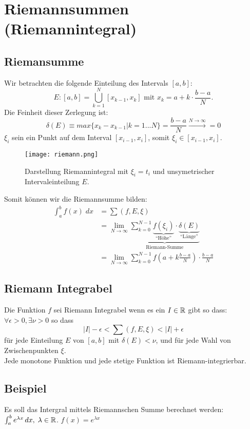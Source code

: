\section{Riemannsummen (Riemannintegral)}
\subsection{Riemansumme}
Wir betrachten die folgende Einteilung des Intervals $[a,b]$:\[
E: [a,b] = \bigcup_{k=1}^{N}[x_{k-1}, x_k] \text{ mit } x_k = a + k \cdot \frac{b-a}{N}.
\]
Die Feinheit dieser Zerlegung ist:\[
\delta(E) \equiv max\{x_k - x_{k-1}|k = 1...N\} = \frac{b-a}{N} \xrightarrow{N \to \infty} = 0
\]
$\xi_i$ sein ein Punkt auf dem Interval $[x_{i-1}, x_i]$, somit $\xi_i \in[x_{i-1}, x_i]$.\\

\begin{figure}
	\texttt{[image: riemann.png]}
	\caption[Bildunterschrift]{Darstellung Riemannintegral mit $\xi_i = t_i$ und unsymetrischer Intervaleinteilung $E$.}
\end{figure}

Somit können wir die Riemannsumme bilden:
\begin{align*}
\int_a^b f(x)\;dx &=\sum (f,E,\xi)\\
&= \lim_{N \to \infty} \underbrace{\sum_{k=0}^{N-1}
\underbrace{f(\xi_i)}_{\text{``Höhe''}} \cdot
\underbrace{\delta(E)}_{\text{``Länge''}}}_{\text{Riemann-Summe}}\\
&= \lim_{N \to \infty} \sum_{k=0}^{N-1} {f(a +
k\frac{b-a}{N})} \cdot \frac{b-a}{N}
\end{align*}


\subsection{Riemann Integrabel}
Die Funktion $f$ sei Riemann Integrabel wenn es ein $I \in \mathbb{R}$ gibt so dass: $\forall \epsilon > 0, \exists \nu > 0$ so dass \[
|I| - \epsilon < \sum (f,E,\xi) < |I| + \epsilon
\]
für jede Einteilung $E$ von $[a,b]$ mit $\delta(E) < \nu$, und für jede Wahl von Zwischenpunkten $\xi$.\\
Jede monotone Funktion und jede stetige Funktion ist Riemann-integrierbar.
\subsection*{Beispiel}
Es soll das Intergral mittels Riemannschen Summe berechnet werden: $\int_a^b
e^{\lambda x}\,dx, \; \lambda \in \mathbb{R}$. $f(x) = e^{\lambda x}$

